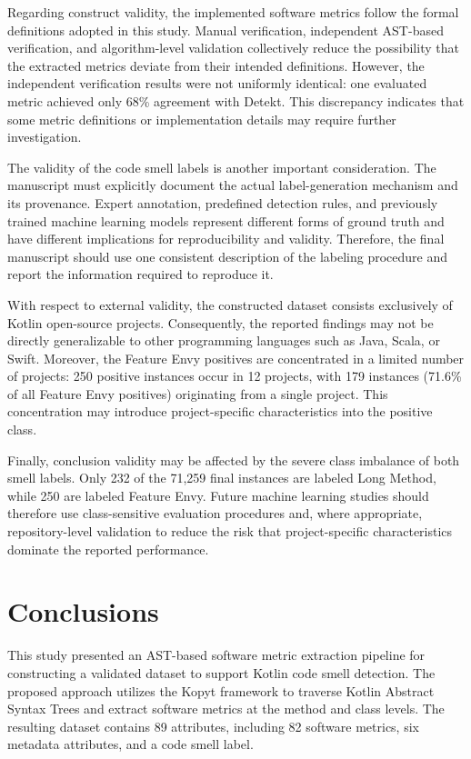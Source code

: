 \documentclass[]{einformatica}
\begin{document}
Regarding construct validity, the implemented software metrics follow the formal definitions adopted in this study. Manual verification, independent AST-based verification, and algorithm-level validation collectively reduce the possibility that the extracted metrics deviate from their intended definitions. However, the independent verification results were not uniformly identical: one evaluated metric achieved only 68\% agreement with Detekt. This discrepancy indicates that some metric definitions or implementation details may require further investigation.

The validity of the code smell labels is another important consideration. The manuscript must explicitly document the actual label-generation mechanism and its provenance. Expert annotation, predefined detection rules, and previously trained machine learning models represent different forms of ground truth and have different implications for reproducibility and validity. Therefore, the final manuscript should use one consistent description of the labeling procedure and report the information required to reproduce it.

With respect to external validity, the constructed dataset consists exclusively of Kotlin open-source projects. Consequently, the reported findings may not be directly generalizable to other programming languages such as Java, Scala, or Swift. Moreover, the Feature Envy positives are concentrated in a limited number of projects: 250 positive instances occur in 12 projects, with 179 instances (71.6\% of all Feature Envy positives) originating from a single project. This concentration may introduce project-specific characteristics into the positive class.

Finally, conclusion validity may be affected by the severe class imbalance of both smell labels. Only 232 of the 71,259 final instances are labeled Long Method, while 250 are labeled Feature Envy. Future machine learning studies should therefore use class-sensitive evaluation procedures and, where appropriate, repository-level validation to reduce the risk that project-specific characteristics dominate the reported performance.

\section{Conclusions}\label{sec:Conclusions}

This study presented an AST-based software metric extraction pipeline for constructing a validated dataset to support Kotlin code smell detection. The proposed approach utilizes the Kopyt framework to traverse Kotlin Abstract Syntax Trees and extract software metrics at the method and class levels. The resulting dataset contains 89 attributes, including 82 software metrics, six metadata attributes, and a code smell label.
\end{document}
